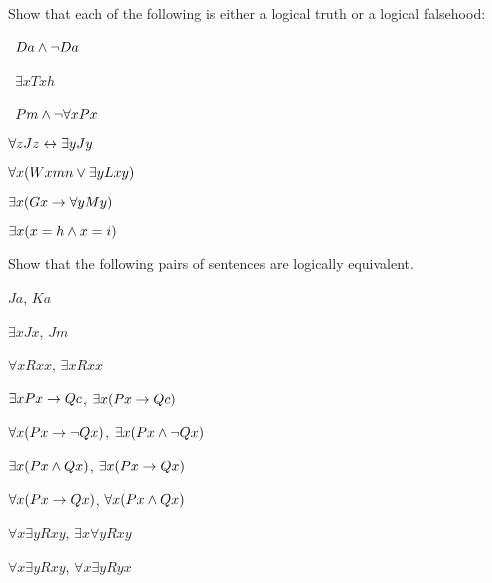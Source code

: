 \practiceproblems


\problempart
Show that each of the following is either a logical truth or a logical falsehood:
\begin{earg}
\item \leftsolutions\ $Da \wedge \neg Da$
\item \leftsolutions\ $\exists x Txh$
\item \leftsolutions\ $Pm \wedge \neg\forall x Px$
\item $\forall z Jz \leftrightarrow \exists y Jy$
\item $\forall x (Wxmn \vee \exists yLxy)$
\item $\exists x (Gx \rightarrow \forall y My)$
\item $\exists x (x = h \wedge x = i)$
\end{earg}

\solutions
\problempart
\label{pr.Equiv}
Show that the following pairs of sentences are logically equivalent.
\begin{earg}
\item $Ja$, $Ka$
\item $\exists x Jx$, $Jm$
\item $\forall x Rxx$, $\exists x Rxx$
\item $\exists x Px \rightarrow Qc$, $\exists x (Px \rightarrow Qc)$
\item $\forall x(Px \rightarrow \neg Qx)$, $\exists x(Px \wedge \neg Qx)$
\item $\exists x(Px \wedge Qx)$, $\exists x(Px \rightarrow Qx)$
\item $\forall x(Px\rightarrow Qx)$, $\forall x(Px \wedge Qx)$
\item $\forall x\exists y Rxy$, $\exists x\forall y Rxy$
\item $\forall x\exists y Rxy$, $\forall x\exists y Ryx$
\end{earg}



